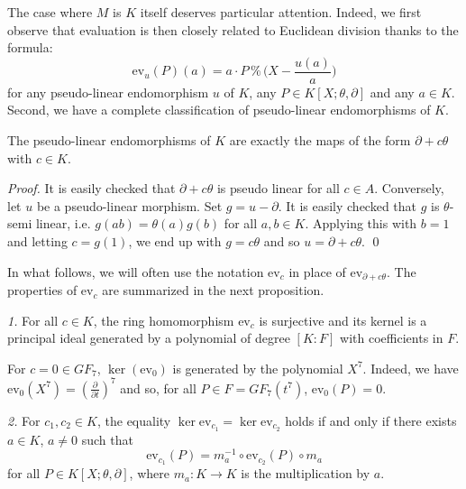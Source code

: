 \documentclass[a4paper]{llncs}
\newcommand{\ev}[1]{\textrm{ev}_{#1}}
\renewcommand{\mod}{\,\%\,}
\begin{document}
The case where $M$ is $K$ itself deserves particular attention.
Indeed, we first observe that evaluation is then closely related to
Euclidean division thanks to the formula:
$$\textstyle \ev{u}(P)(a) = 
a \cdot P \mod \big(X - \frac{u(a)}{a}\big)$$
for any pseudo-linear endomorphism $u$ of $K$, any $P \in K[X;\theta,
\partial]$ and any $a \in K$. Second, we have a complete classification
of pseudo-linear endomorphisms of $K$.

\begin{proposition}
The pseudo-linear endomorphisms of $K$ are exactly the maps of
the form $\partial + c\theta$ with $c \in K$.
\end{proposition}

\begin{proof}
It is easily checked that $\partial + c\theta$ is pseudo linear
for all $c\in A$. Conversely, let $u$ be a pseudo-linear morphism.
Set $g = u - \partial$. It is easily checked that $g$ is 
$\theta$-semi linear, i.e. $g(ab) = \theta(a) g(b)$ for all $a, b 
\in K$. Applying this with $b = 1$ and letting $c = g(1)$, we end
up with $g = c \theta$ and so $u = \partial + c\theta$. \qed
\end{proof}

In what follows, we will often use the notation $\ev c$ in place of 
$\ev{\partial + c \theta}$. The properties of $\ev c$ are summarized
in the next proposition.

\begin{proposition}
\label{prop:evc}
\noindent
\textit{1.}
For all $c \in K$, the ring homomorphism $\ev{c}$ is surjective
and its kernel is a principal ideal generated by a polynomial of
degree $[K:F]$ with coefficients in $F$.

\begin{example}
For $c = 0 \in GF_7$, $\ker (\ev 0)$ is generated by the polynomial $X^7$. Indeed, we have $\ev 0 (X^7) = (\frac{\partial}{\partial t})^7$ and so, for all $P \in F = GF_7(t^7)$, $\ev 0 (P) = 0$.
\end{example}

\noindent
\textit{2.}
For $c_1, c_2 \in K$, the equality $\ker \ev{c_1} = \ker \ev{c_2}$ holds 
if and only if there exists $a \in K$, $a \neq 0$ such that 
\begin{equation}
\label{eq:}
\ev{c_1}(P) = m_a^{-1} \circ \ev{c_2}(P) \circ m_a
\end{equation}
for all $P \in K[X;\theta,\partial]$, where $m_a : K \to K$ is the
multiplication by $a$.
\end{proposition}
\end{document}
